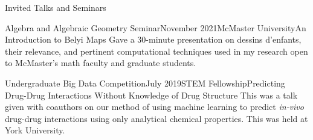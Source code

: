 \begin{rSection}{Invited Talks and Seminars}

\begin{rSubsection}{Algebra and Algebraic Geometry Seminar}{November 2021}{McMaster University}{An Introduction to Belyi Maps}
	Gave a 30-minute presentation on dessins d'enfants, their relevance, and pertinent computational techniques used in my research open to McMaster's math faculty and graduate students.
\end{rSubsection}
\smallskip

\begin{rSubsection}{Undergraduate Big Data Competition}{July 2019}{STEM Fellowship}{Predicting Drug-Drug Interactions Without Knowledge of Drug Structure}
	This was a talk given with coauthors on our method of using machine learning to predict \textit{in-vivo} drug-drug interactions using only analytical chemical properties. This was held at York University.
\end{rSubsection}






\end{rSection}